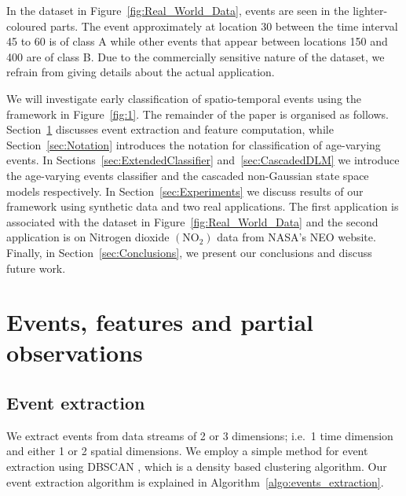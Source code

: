 \documentclass[a4paper,11pt]{article}
\begin{document}
In the dataset in Figure~\ref{fig:Real_World_Data}, events are seen in the lighter-coloured parts. The event approximately at location 30 between the time interval 45 to 60 is of class A while other events that appear between locations 150 and 400 are of class B. Due to the commercially sensitive nature of the dataset, we refrain from giving details about the actual application.

We will investigate early classification of spatio-temporal events using the framework in Figure~\ref{fig:1}. The remainder of the paper is organised as follows. Section~\ref{sec:EventExtract} discusses event extraction and feature computation, while Section~\ref{sec:Notation} introduces the notation for classification of age-varying events. In Sections~\ref{sec:ExtendedClassifier} and~\ref{sec:CascadedDLM} we introduce the age-varying events classifier and the cascaded non-Gaussian state space models respectively. %
In Section~\ref{sec:Experiments} we discuss results of our framework using synthetic data and two real applications. The first application is associated with the dataset in Figure~\ref{fig:Real_World_Data} and the second application is on Nitrogen dioxide $(\text{NO}_2)$ data from NASA's NEO \cite{OMINO2} website. Finally, in Section~\ref{sec:Conclusions}, we present our conclusions and discuss future work.

\section{Events, features and partial observations} \label{sec:EventExtract}

\subsection{Event extraction}

We extract events from data streams of 2 or 3 dimensions; i.e.\ 1 time dimension and either 1 or 2 spatial dimensions. We employ a simple method for event extraction using DBSCAN \citep{ester1996density}, which is a density based clustering algorithm. Our event extraction algorithm is explained in Algorithm~\ref{algo:events_extraction}.
\end{document}

